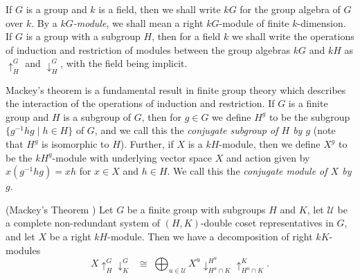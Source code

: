 \documentclass[ALCO,Unicode,published]{cedram}
\begin{document}
If $G$ is a group and $k$ is a field, then we shall write $kG$ for the group algebra of $G$ over $k$. By a \textit{$kG$-module}, we shall
mean a right $kG$-module of finite $k$-dimension.
If $G$ is a group with a subgroup $H$, then for a field $k$ we shall write the operations of induction and restriction of modules
between the group algebras $kG$ and $kH$ as $\uparrow^{G}_{H}$ and $\downarrow^{G}_{H}$, with the field being implicit.

Mackey's theorem is a fundamental result in finite group theory which describes the interaction of the operations of induction and
restriction. If $G$ is a finite group and $H$ is a subgroup of $G$, then for $g \in G$ we define $H^g$ to be the subgroup
$\{g^{-1}hg \mid h \in H\}$ of $G$, and we call this the \textit{conjugate subgroup of $H$ by $g$} (note that $H^g$ is isomorphic to $H$).
Further, if $X$ is a $kH$-module, then we define $X^g$ to be the $kH^g$-module with underlying vector space $X$ and action given by
$x(g^{-1}hg) = xh$ for $x \in X$ and $h \in H$. We call this the \textit{conjugate module of $X$ by $g$}.

\begin{theo}\label{mackey:thm}\textup{(}Mackey's Theorem \cite[Theorem 3.3.4]{BRCI}\textup{)}
Let $G$ be a finite group with subgroups $H$ and $K$, let $\mathcal{U}$ be a complete non-redundant system of $(H,K)$-double coset
representatives in $G$, and let $X$ be a right $kH$-module. Then we have a decomposition of right $kK$-modules
\[
X\!\uparrow^{G}_{H}\downarrow^{G}_{K} \;\;\cong\;
\bigoplus_{u \in \mathcal{U}} X^u\downarrow^{H^u}_{H^u\cap K}\uparrow^{K}_{H^u\cap K}.
\]
\end{theo}
\end{document}
